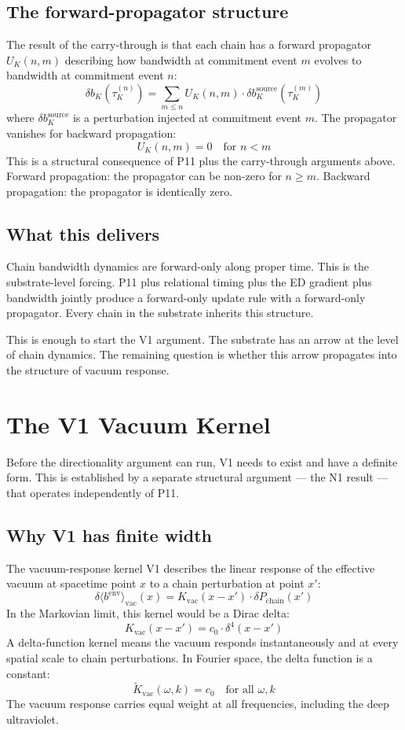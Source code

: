 \documentclass[11pt,a4paper]{article}
\begin{document}
\subsection{The forward-propagator structure}

The result of the carry-through is that each chain has a forward propagator $U_K(n, m)$ describing how bandwidth at commitment event $m$ evolves to bandwidth at commitment event $n$:
\[
\delta b_K(\tau_K^{(n)}) = \sum_{m \leq n} U_K(n, m) \cdot \delta b_K^{\mathrm{source}}(\tau_K^{(m)})
\]
where $\delta b_K^{\mathrm{source}}$ is a perturbation injected at commitment event $m$. The propagator vanishes for backward propagation:
\[
U_K(n, m) = 0 \quad \text{for } n < m
\]
This is a structural consequence of P11 plus the carry-through arguments above. Forward propagation: the propagator can be non-zero for $n \geq m$. Backward propagation: the propagator is identically zero.

\subsection{What this delivers}

Chain bandwidth dynamics are forward-only along proper time. This is the substrate-level forcing. P11 plus relational timing plus the ED gradient plus bandwidth jointly produce a forward-only update rule with a forward-only propagator. Every chain in the substrate inherits this structure.

This is enough to start the V1 argument. The substrate has an arrow at the level of chain dynamics. The remaining question is whether this arrow propagates into the structure of vacuum response.

\section{The V1 Vacuum Kernel}

Before the directionality argument can run, V1 needs to exist and have a definite form. This is established by a separate structural argument --- the N1 result --- that operates independently of P11.

\subsection{Why V1 has finite width}

The vacuum-response kernel V1 describes the linear response of the effective vacuum at spacetime point $x$ to a chain perturbation at point $x'$:
\[
\delta \langle b^{\mathrm{env}}\rangle_{\mathrm{vac}}(x) = K_{\mathrm{vac}}(x - x') \cdot \delta P_{\mathrm{chain}}(x')
\]
In the Markovian limit, this kernel would be a Dirac delta:
\[
K_{\mathrm{vac}}(x - x') = c_0 \cdot \delta^{4}(x - x')
\]
A delta-function kernel means the vacuum responds instantaneously and at every spatial scale to chain perturbations. In Fourier space, the delta function is a constant:
\[
\tilde K_{\mathrm{vac}}(\omega, k) = c_0 \quad \text{for all } \omega, k
\]
The vacuum response carries equal weight at all frequencies, including the deep ultraviolet.
\end{document}
